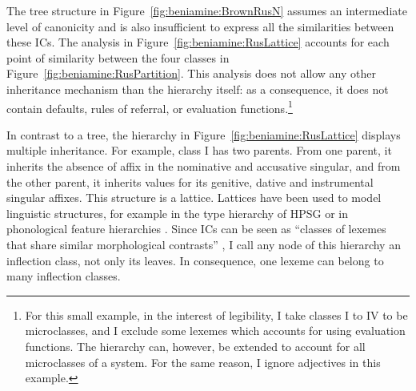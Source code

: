 \documentclass[output=paper]{langscibook}
\begin{document}
    The tree structure in Figure~\ref{fig:beniamine:BrownRusN} assumes an intermediate level of canonicity and is also insufficient to express all the similarities between these ICs. The analysis in Figure~\ref{fig:beniamine:RusLattice} accounts for each point of similarity between the four classes in Figure~\ref{fig:beniamine:RusPartition}. This analysis does not allow any other inheritance mechanism than the hierarchy itself: as a consequence, it does not contain defaults, rules of referral, or evaluation functions.\footnote{For this small example, in the interest of legibility, I take classes I to IV to be microclasses, and I exclude some lexemes which \citet{Brown1998} accounts for using evaluation functions. The hierarchy can, however, be extended to account for all microclasses of a system. For the same reason, I ignore adjectives in this example.}

    In contrast to a tree, the hierarchy in Figure~\ref{fig:beniamine:RusLattice} displays multiple inheritance. For example, class I has two parents. From one parent, it inherits the absence of affix in the nominative and accusative singular, and from the other parent, it inherits values for its genitive, dative and instrumental singular affixes. This structure is a lattice. Lattices have been used to model linguistic structures, for example in the type hierarchy of HPSG \citep{Flickinger1987,PollardSag1994,GinzburgSag2000} or in phonological feature hierarchies \citep{ChomskyHalle1968,Frisch1997}. Since ICs can be seen as ``classes of lexemes that share similar morphological contrasts'' \citep[4]{BrownHippisley2012}, I call any node of this hierarchy an inflection class, not only its leaves. In consequence, one lexeme can belong to many inflection classes.
\end{document}

